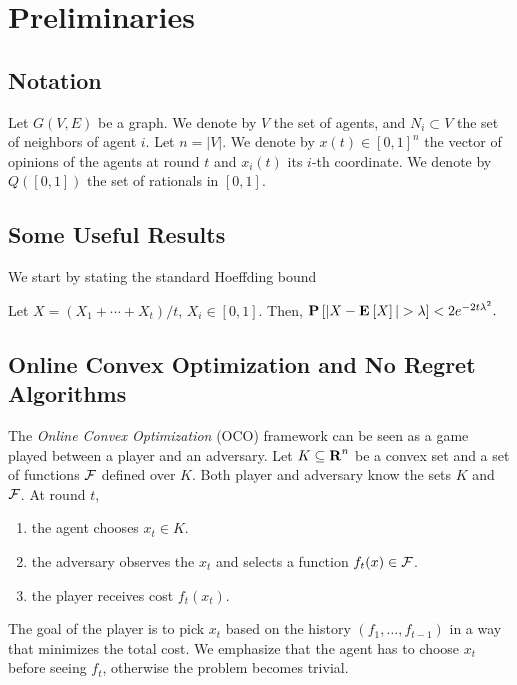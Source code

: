 \section{Preliminaries}
\subsection{Notation}
Let $G(V,E)$ be a graph. We denote by $V$ the set of agents,
and $N_{i} \subset V$ the set of neighbors of agent $i$. Let $n = |V|$.
We denote by $x(t)\in [0,1]^n$ the vector of opinions of the agents at round
$t$ and $x_i(t)$ its $i$-th coordinate. We denote by $Q([0,1])$
the set of rationals in $[0,1]$.

\subsection{Some Useful Results}
We start by stating the standard Hoeffding bound
\begin{lemma}\label{l:hoeffding}
  Let $X = (X_1 +\cdots + X_t) /t$, $X_i \in [0,1]$.
  Then,
  \(
    \Prob{|X - \Exp{X} | > \lambda} < 2 e^{-2 t \lambda^2}.
  \)
\end{lemma}

\subsection{Online Convex Optimization and No Regret Algorithms}

The \emph{Online Convex Optimization} (OCO) framework can be seen
as a game played between a player and an adversary. Let
$K \subseteq \bm{\mathrm{R}}^n$ be a convex set and a set of functions
$\mathcal{F}$ defined over $K$.  Both player and adversary know the sets
$K$ and $\mathcal{F}$.  At round $t$,
\begin{enumerate}
  \item the agent chooses $x_t \in K$.

  \item the adversary observes the $x_t$ and selects a function
    $f_t(x) \in \mathcal{F}$.

  \item the player receives cost $f_t(x_t)$.
\end{enumerate}

The goal of the player is to pick $x_t$ based on the history
$(f_1,\ldots,f_{t-1})$ in a way that minimizes the total cost. We emphasize
that the agent has to choose $x_t$ before seeing $f_t$, otherwise the
problem becomes trivial.

